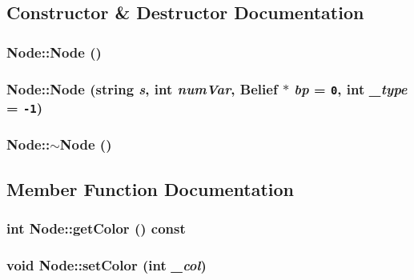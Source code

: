 \subsection{Constructor \& Destructor Documentation}
\subsubsection{\setlength{\rightskip}{0pt plus 5cm}Node::Node ()\hspace{0.3cm}{\tt  [inline]}}\label{classNode_74f89688a500bb12a891b0c521284ae1}


\subsubsection{\setlength{\rightskip}{0pt plus 5cm}Node::Node (string {\em s}, int {\em numVar}, {\bf Belief} $\ast$ {\em bp} = {\tt 0}, int {\em \_\-type} = {\tt -1})}\label{classNode_4ad7f425f80a8769a08aa91f2aa4a542}


\subsubsection{\setlength{\rightskip}{0pt plus 5cm}Node::$\sim$Node ()\hspace{0.3cm}{\tt  [inline]}}\label{classNode_261e6a1e75de946e7feacb3007165435}




\subsection{Member Function Documentation}
\subsubsection{\setlength{\rightskip}{0pt plus 5cm}int Node::getColor () const\hspace{0.3cm}{\tt  [inline]}}\label{classNode_1abe470a6d6918e996c11392cc9c0c20}


\subsubsection{\setlength{\rightskip}{0pt plus 5cm}void Node::setColor (int {\em \_\-col})\hspace{0.3cm}{\tt  [inline]}}\label{classNode_85dad9bdc7f7f9564fe432099567b2a6}



